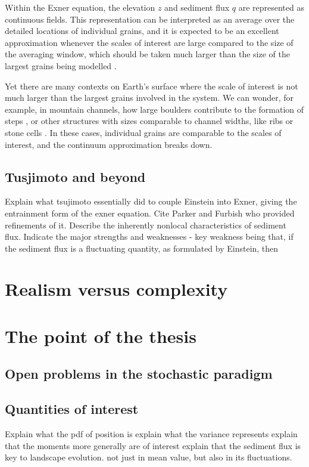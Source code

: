 Within the Exner equation, the elevation $z$ and sediment flux $q$ are represented as continuous fields. This representation can be interpreted as an average over the detailed locations of individual grains, and it is expected to be an excellent approximation whenever the scales of interest are large compared to the size of the averaging window, which should be taken much larger than the size of the largest grains being modelled \citep{Coleman2009}. 

Yet there are many contexts on Earth's surface where the scale of interest is not much larger than the largest grains involved in the system. We can wonder, for example, in mountain channels, how large boulders contribute to the formation of steps \citep{Zimmerman2008,Saletti2020}, or other structures with sizes comparable to channel widths, like ribs or stone cells \citep{Hassan2008,Venditti2017}. In these cases, individual grains are comparable to the scales of interest, and the continuum approximation breaks down.  


\subsection{Tusjimoto and beyond}
Explain what tsujimoto essentially did to couple Einstein into Exner, giving the entrainment form of the exner equation.
Cite Parker and Furbish who provided refinements of it.
Describe the inherently nonlocal characteristics of sediment flux.
Indicate the major strengths and weaknesses -  key weakness being that, if the sediment flux is a fluctuating quantity, as formulated by Einstein, then 

\section{Realism versus complexity}

\section{The point of the thesis} 

\subsection{Open problems in the stochastic paradigm}

\subsection{Quantities of interest}
Explain what the pdf of position is
explain what the variance represents
explain that the moments more generally are of interest
explain that the sediment flux is key to landscape evolution. not just in mean value, but also in its fluctuations.


